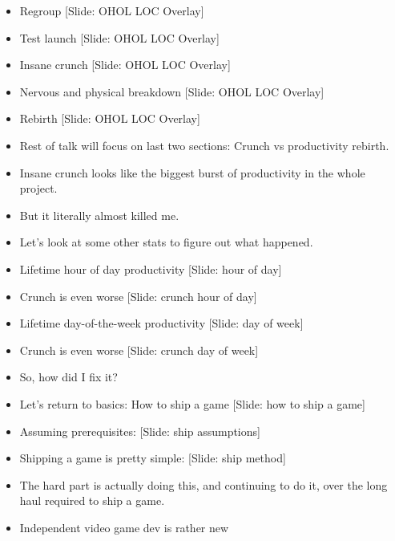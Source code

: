 \documentclass[12pt]{article}
\begin{document}
{\begin{itemize}
\item Regroup [Slide: OHOL LOC Overlay]

\item Test launch [Slide: OHOL LOC Overlay]

\item Insane crunch [Slide: OHOL LOC Overlay]

\item Nervous and physical breakdown [Slide: OHOL LOC Overlay]

\item Rebirth [Slide: OHOL LOC Overlay]

\item Rest of talk will focus on last two sections:  Crunch vs productivity rebirth. 

\item Insane crunch looks like the biggest burst of productivity in the whole project.

\item But it literally almost killed me.

\item Let's look at some other stats to figure out what happened.

\item Lifetime hour of day productivity [Slide: hour of day]

\item Crunch is even worse [Slide: crunch hour of day]

\item Lifetime day-of-the-week productivity [Slide: day of week]

\item Crunch is even worse [Slide: crunch day of week]

\item So, how did I fix it?

\item Let's return to basics:  How to ship a game [Slide: how to ship a game]

\item Assuming prerequisites:  [Slide: ship assumptions]

\item Shipping a game is pretty simple:  [Slide: ship method]

\item The hard part is actually doing this, and continuing to do it, over the long haul required to ship a game.

\item Independent video game dev is rather new


\end{itemize}}
\end{document}
